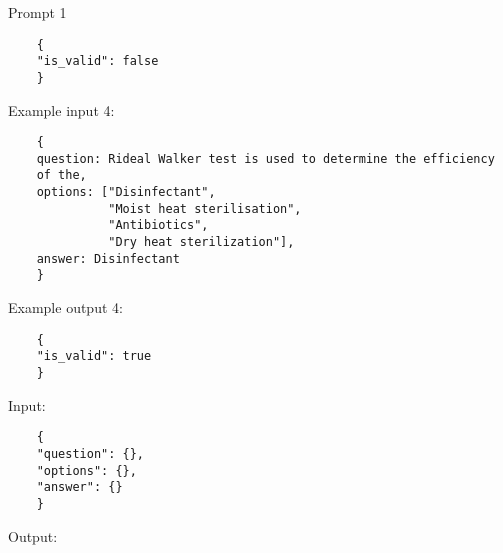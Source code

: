 \begin{promptbox}{Prompt 1}
\begin{verbatim}
    {
    "is_valid": false
    }
\end{verbatim}
Example input 4:

\begin{verbatim}
    {
    question: Rideal Walker test is used to determine the efficiency 
    of the,
    options: ["Disinfectant", 
              "Moist heat sterilisation",       
              "Antibiotics", 
              "Dry heat sterilization"],
    answer: Disinfectant
    }
\end{verbatim}
Example output 4:

\begin{verbatim}
    {
    "is_valid": true
    }
\end{verbatim}

Input:
\begin{verbatim}
    {
    "question": {},
    "options": {},
    "answer": {}
    }
\end{verbatim}

Output:

\end{promptbox}

